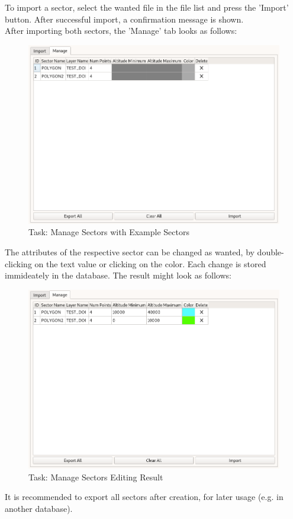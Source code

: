 To import a sector, select the wanted file in the file list and press the 'Import' button. After successful import, a confirmation message is shown. \\

After importing both sectors, the 'Manage' tab looks as follows:

\begin{figure}[H]
    \includegraphics[width=16cm,frame]{../screenshots/manage_sectors_manage2.png}
  \caption{Task: Manage Sectors with Example Sectors}
\end{figure}

The attributes of the respective sector can be changed as wanted, by double-clicking on the text value or clicking on the color. Each change is stored immideately in the database. The result might look as follows:\\

\begin{figure}[H]
    \includegraphics[width=16cm,frame]{../screenshots/manage_sectors_done.png}
  \caption{Task: Manage Sectors Editing Result}
\end{figure}

It is recommended to export all sectors after creation, for later usage (e.g. in another database).

